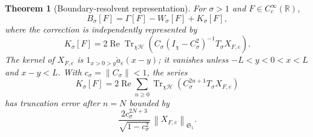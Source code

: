 \documentclass[11pt]{article}
\numberwithin{equation}{section}
\newtheorem{theorem}{Theorem}[section]
\theoremstyle{definition}
\theoremstyle{remark}
\newcommand{\HH}{\mathcal H}
\newcommand{\Tr}{\operatorname{Tr}}
\newcommand{\Rea}{\operatorname{Re}}
\newcommand{\Id}{I}
\newcommand{\Sone}{\mathfrak S_1}
\newcommand{\norm}[1]{\left\lVert #1\right\rVert}
\begin{document}
\begin{theorem}[Boundary-resolvent representation]\label{thm:boundary}
For \(\sigma>1\) and \(F\in C_c^\infty(\mathbb R)\),
\begin{equation}\label{eq:boundary-formula}
B_\sigma[F]=\Gamma[F]-W_\sigma[F]+K_\sigma[F],
\end{equation}
where the correction is independently represented by
\begin{equation}\label{eq:short-boundary}
K_\sigma[F]=
2\Rea\Tr_{\chi\HH}
\left(C_\sigma(\Id_\chi-C_\sigma^2)^{-1}T_\sigma X_{F,e}\right).
\end{equation}
The kernel of \(X_{F,e}\) is
\(1_{x>0>y}\check a_e(x-y)\); it vanishes unless
\(-L<y<0<x<L\) and \(x-y<L\).
With \(c_\sigma=\norm{C_\sigma}<1\), the series
\begin{equation}\label{eq:return-series}
K_\sigma[F]=2\Rea\sum_{n\ge0}
\Tr_{\chi\HH}(C_\sigma^{2n+1}T_\sigma X_{F,e})
\end{equation}
has truncation error after \(n=N\) bounded by
\begin{equation}\label{eq:return-series-error}
\frac{2c_\sigma^{2N+3}}{\sqrt{1-c_\sigma^2}}\,
\norm{X_{F,e}}_{\Sone}.
\end{equation}
\end{theorem}
\end{document}
